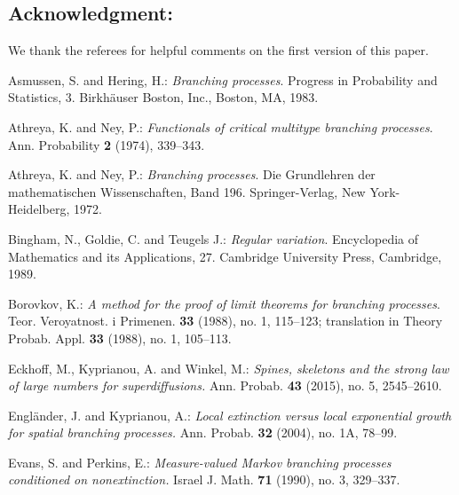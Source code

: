\documentclass[12pt,a4paper]{amsart}
\def\MR#1{\href{http://www.ams.org/mathscinet-getitem?mr=#1}{MR-#1}}
\theoremstyle{definition}
\numberwithin{equation}{section}
\begin{document}
\subsection*{Acknowledgment:} 
We thank the referees for helpful comments on the first version of this paper.

\begin{thebibliography}{10}
	
	Asmussen, S. and Hering, H.:
	\emph{Branching processes}.
	Progress in Probability and Statistics, 3.
	Birkh{\"a}user Boston, Inc., Boston, MA, 1983.
	
	Athreya, K. and Ney, P.:
	\emph{Functionals of critical multitype branching processes}.
	Ann. Probability \textbf{2} (1974), 339--343. 
	
	Athreya, K. and Ney, P.:
	\emph{Branching processes}.
	Die Grundlehren der mathematischen Wissenschaften, Band 196.
	Springer-Verlag, New York-Heidelberg, 1972.
	
	Bingham, N., Goldie, C. and Teugels J.:
	\emph{Regular variation}.
	Encyclopedia of Mathematics and its Applications, 27.
	Cambridge University Press, Cambridge, 1989.
	
	Borovkov, K.:
	\emph{A method for the proof of limit theorems for branching processes}.
	Teor. Veroyatnost. i Primenen. \textbf{33} (1988), no. 1, 115--123;
	translation in Theory Probab. Appl. \textbf{33} (1988), no. 1, 105–113.
	
	Eckhoff, M., Kyprianou, A. and Winkel, M.:
	\emph{Spines, skeletons and the strong law of large numbers for superdiffusions.}
	Ann. Probab. \textbf{43} (2015), no. 5, 2545–2610.
	
	Engländer, J. and Kyprianou, A.:
	\emph{Local extinction versus local exponential growth for spatial branching processes.}
	Ann. Probab. \textbf{32} (2004), no. 1A, 78–99.
	
	Evans, S. and Perkins, E.:
	\emph{Measure-valued Markov branching processes conditioned on nonextinction.}
	Israel J. Math. \textbf{71} (1990), no. 3, 329–337.
	

\end{thebibliography}
\end{document}

